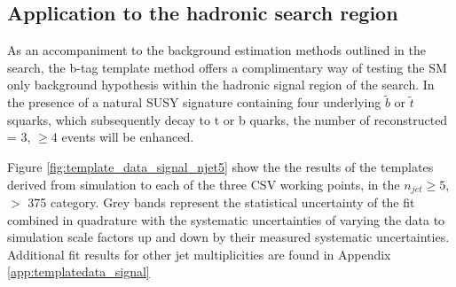 
\subsection{Application to the \alphat hadronic search region}
\label{subsec:templatedataresults}

As an accompaniment to the background estimation methods outlined in the \alphat search, the b-tag template method offers a complimentary way of testing the \ac{SM} only background hypothesis within the hadronic signal region of the search. In the presence of a natural \ac{SUSY} signature containing four underlying $\widetilde{b}$ or $\widetilde{t}$ squarks, which subsequently decay to t or b quarks, the number of reconstructed \nbreco = 3, $\geq 4$ events will be enhanced.

Figure \ref{fig:template_data_signal_njet5} show the  the results of the templates derived from simulation to each of the three \ac{CSV} working points, in the $n_{jet} \geq 5$, \theht $>$ 375 \GeV category.  Grey bands represent the statistical uncertainty of the fit combined in quadrature with the systematic uncertainties of varying the data to simulation scale factors up and down by their measured systematic uncertainties.  Additional fit results for other jet multiplicities are found in Appendix \ref{app:templatedata_signal}  

